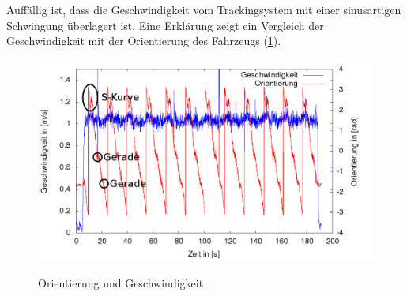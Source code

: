 Auffällig ist, dass die Geschwindigkeit vom Trackingsystem mit einer sinusartigen Schwingung überlagert ist. Eine Erklärung zeigt ein Vergleich der Geschwindigkeit
mit der Orientierung des Fahrzeugs (\cref{fig:orientation}).

\begin{figure}[H]
\centering
\includegraphics[width=\textwidth]{test.png}\\
\caption{Orientierung und Geschwindigkeit}%
\label{fig:orientation}
\end{figure}


